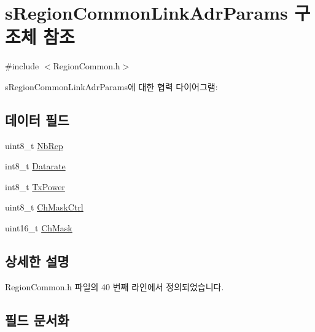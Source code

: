 \hypertarget{structs_region_common_link_adr_params}{}\section{s\+Region\+Common\+Link\+Adr\+Params 구조체 참조}
\label{structs_region_common_link_adr_params}


{\ttfamily \#include $<$Region\+Common.\+h$>$}



s\+Region\+Common\+Link\+Adr\+Params에 대한 협력 다이어그램\+:
\subsection*{데이터 필드}
\begin{DoxyCompactItemize}
\item 
uint8\+\_\+t \mbox{\hyperlink{structs_region_common_link_adr_params_a3b99538671d86dbfe2f6754ce6f9577a}{Nb\+Rep}}
\item 
int8\+\_\+t \mbox{\hyperlink{structs_region_common_link_adr_params_ae2f6080f3aa0e9485c55513ca56bb24d}{Datarate}}
\item 
int8\+\_\+t \mbox{\hyperlink{structs_region_common_link_adr_params_a037b4f849fa8ed4aa1d3c58aef2b28ec}{Tx\+Power}}
\item 
uint8\+\_\+t \mbox{\hyperlink{structs_region_common_link_adr_params_ac5e1891f30a172b2ce39bc3498e1843d}{Ch\+Mask\+Ctrl}}
\item 
uint16\+\_\+t \mbox{\hyperlink{structs_region_common_link_adr_params_adb3d38c312a46e617b1319f97dd56a87}{Ch\+Mask}}
\end{DoxyCompactItemize}


\subsection{상세한 설명}


Region\+Common.\+h 파일의 40 번째 라인에서 정의되었습니다.



\subsection{필드 문서화}
\mbox{\label{structs_region_common_link_adr_params_adb3d38c312a46e617b1319f97dd56a87}} 
